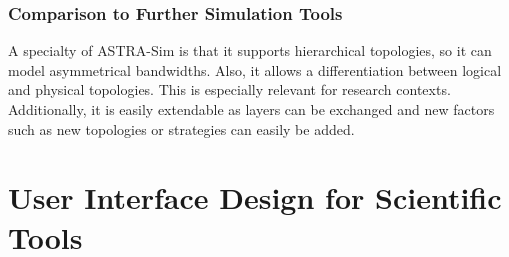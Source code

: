 \subsubsection*{Comparison to Further Simulation Tools}

A specialty of \ac{ASTRA-Sim} is that it supports hierarchical topologies, so it can model asymmetrical bandwidths. Also, it allows a differentiation between logical and physical topologies. This is especially relevant for research contexts.
Additionally, it is easily extendable as layers can be exchanged and new factors such as new topologies or strategies can easily be added.



\section{User Interface Design for Scientific Tools}




